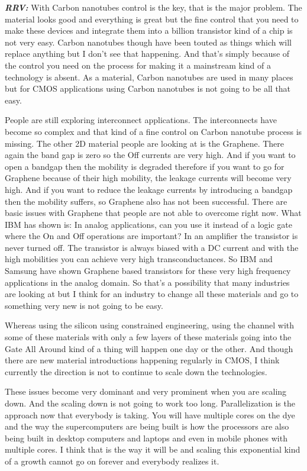 \begin{multicols}{2}
\textbf{\textit{RRV:}} With Carbon nanotubes control is the key, that is the major problem. The material looks good and everything is great but the fine control that you need to make these devices and integrate them into a billion transistor kind of a chip is not very easy. Carbon nanotubes though have been touted as things which will replace anything but I don’t see that happening. And that’s simply because of the control you need on the process for making it a mainstream kind of a technology is absent. As a material, Carbon nanotubes are used in many places but for CMOS applications using Carbon nanotubes is not going to be all that easy.

People are still exploring interconnect applications. The interconnects have become so complex and that kind of a fine control on Carbon nanotube process is missing. The other 2D material people are looking at is the Graphene. There again the band gap is zero so the Off currents are very high. And if you want to open a bandgap then the mobility is degraded therefore if you want to go for Graphene because of their high mobility, the leakage currents will become very high. And if you want to reduce the leakage currents by introducing a bandgap then the mobility suffers, so Graphene also has not been successful. There are basic issues with Graphene that people are not able to overcome right now. What IBM has shown is: In analog applications, can you use it instead of a logic gate where the On and Off operations are important? In an amplifier the transistor is never turned off. The transistor is always biased with a DC current and with the high mobilities you can achieve very high transconductances. So IBM and Samsung have shown Graphene based transistors for these very high frequency applications in the analog domain. So that’s a possibility that many industries are looking at but I think for an industry to change all these materials and go to something very new is not going to be easy. 

Whereas using the silicon using constrained engineering, using the channel with some of these materials with only a few layers of these materials going into the Gate All Around kind of a thing will happen one day or the other. And though there are new material introductions happening regularly in CMOS, I think currently the direction is not to continue to scale down the technologies.

These issues become very dominant and very prominent when you are scaling down. And the scaling down is not going to work too long. Parallelization is the approach now that everybody is taking. You will have multiple cores on the dye and the way the supercomputers are being built is how the processors are also being built in desktop computers and laptops and even in mobile phones with multiple cores. I think that is the way it will be and scaling this exponential kind of a growth cannot go on forever and everybody realizes it.


\end{multicols}
